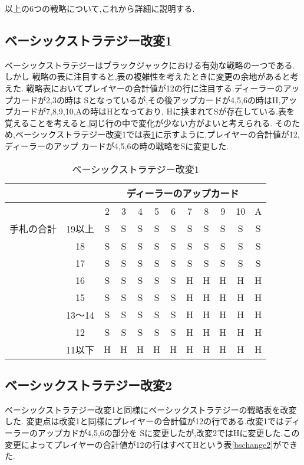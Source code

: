 以上の6つの戦略について,これから詳細に説明する.

\subsection{ベーシックストラテジー改変1}
ベーシックストラテジーはブラックジャックにおける有効な戦略の一つである.しかし
戦略の表に注目すると,表の複雑性を考えたときに変更の余地があると考えた.
戦略表においてプレイヤーの合計値が12の行に注目する.ディーラーのアップカードが2,3の時は
Sとなっているが,その後アップカードが4,5,6の時はH,アップカードが7,8,9,10,Aの時はHとなっており,
Hに挟まれてSが存在している.表を覚えることを考えると,同じ行の中で変化が少ない方がよいと考えられる.
そのため,ベーシックストラテジー改変1では表\ref{bschange1}に示すように,プレイヤーの合計値が12,ディーラーのアップ
カードが4,5,6の時の戦略をSに変更した.

\begin{table}[htbp]
  \centering
  \caption{ベーシックストラテジー改変1\label{bschange1}}
  \begin{tabular}{|c|c|c|c|c|c|c|c|c|c|c|c|}
    \hline
    \multicolumn{2}{|c|}{} & \multicolumn{10}{|c|}{ディーラーのアップカード} \\ \hline
    \multicolumn{2}{|c|}{} & 2 & 3 & 4 & 5 & 6 & 7 & 8 & 9 & 10 & A \\ \hline
    手札の合計 & 19以上 & S & S & S & S & S & S & S & S & S & S \\ \cline{3-12}
              & 18 & S & S & S & S & S & S & S & S & S & S \\ \cline{3-12}
              & 17 & S & S & S & S & S & S & S & S & S & S \\ \cline{3-12}
              & 16 & S & S & S & S & S & H & H & H & H & H \\ \cline{3-12}
              & 15 & S & S & S & S & S & H & H & H & H & H \\ \cline{3-12}
              & 13～14 & S & S & S & S & S & H & H & H & H & H \\ \cline{3-12}
              & 12 & S & S & S & S & S & H & H & H & H & H \\ \cline{3-12}
              & 11以下 & H & H & H & H & H & H & H & H & H & H \\ \hline
  \end{tabular}
\end{table}

\subsection{ベーシックストラテジー改変2}
ベーシックストラテジー改変1と同様にベーシックストラテジーの戦略表を改変した.
変更点は改変1と同様にプレイヤーの合計値が12の行である.改変1ではディーラーのアップカドが4,5,6の部分を
Sに変更したが,改変2ではHに変更した.この変更によってプレイヤーの合計値が12の行はすべてHという表\ref{bschange2}ができた.

